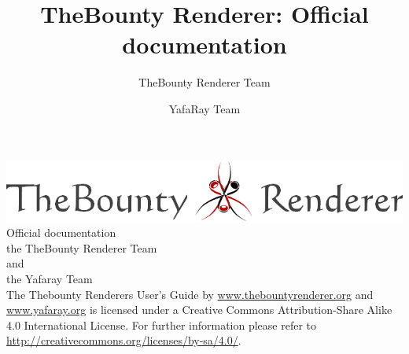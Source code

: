\documentclass{report}
\title{TheBounty Renderer: Official documentation}
\author{TheBounty Renderer Team \and YafaRay Team}
\begin{document}
\begin{titlepage}
    \centering
    \vfill
    {
        \includegraphics[width=.9\textwidth]{images/logo.png} %
        {\Huge Official documentation}\\
        \Large
        \vskip2cm
        the TheBounty Renderer Team\\
        {\large and}
        \\
        the Yafaray Team\\
    }    
    \vfill
    \vfill
    The Thebounty Renderers User's Guide by \url{www.thebountyrenderer.org} and \url{www.yafaray.org} is licensed under a Creative Commons Attribution-Share Alike 4.0 International License. For further information please refer to \url{http://creativecommons.org/licenses/by-sa/4.0/}.
    \begin{flushright}
    \ccbysa
    \end{flushright}
\end{titlepage}
\tableofcontents








\end{document}
